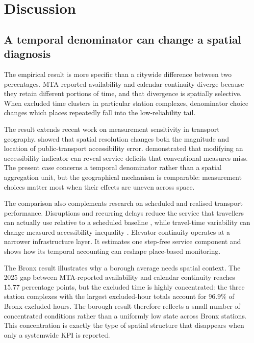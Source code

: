 \section{Discussion}

\subsection{A temporal denominator can change a spatial diagnosis}

The empirical result is more specific than a citywide difference between two percentages. MTA-reported availability and calendar continuity diverge because they retain different portions of time, and that divergence is spatially selective. When excluded time clusters in particular station complexes, denominator choice changes which places repeatedly fall into the low-reliability tail.

The result extends recent work on measurement sensitivity in transport geography. \citet{qu2025} showed that spatial resolution changes both the magnitude and location of public-transport accessibility error. \citet{schroth2026} demonstrated that modifying an accessibility indicator can reveal service deficits that conventional measures miss. The present case concerns a temporal denominator rather than a spatial aggregation unit, but the geographical mechanism is comparable: measurement choices matter most when their effects are uneven across space.

The comparison also complements research on scheduled and realised transport performance. Disruptions and recurring delays reduce the service that travellers can actually use relative to a scheduled baseline \citep{liu2024,nichols2024}, while travel-time variability can change measured accessibility inequality \citep{braga2026}. Elevator continuity operates at a narrower infrastructure layer. It estimates one step-free service component and shows how its temporal accounting can reshape place-based monitoring.

The Bronx result illustrates why a borough average needs spatial context. The 2025 gap between MTA-reported availability and calendar continuity reaches 15.77 percentage points, but the excluded time is highly concentrated: the three station complexes with the largest excluded-hour totals account for 96.9\% of Bronx excluded hours. The borough result therefore reflects a small number of concentrated conditions rather than a uniformly low state across Bronx stations. This concentration is exactly the type of spatial structure that disappears when only a systemwide KPI is reported.


